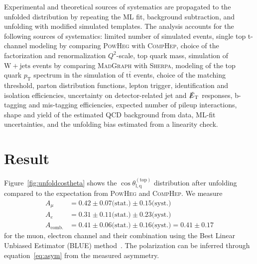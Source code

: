 \documentclass[a4paper]{jpconf}
\newcommand{\wjets}[0]{\mathrm{W+jets}}
\newcommand{\ttbar}[0]{\ensuremath{\mathrm{t\bar{t}}}}
\newcommand{\costheta}[0]{\cos\theta_{\mathrm{l,q}}^{\mathrm{(top)}}}
\newcommand{\pT}[0]{\ensuremath{p_\mathrm{T}}}
\newcommand{\met}[0]{\ensuremath{\slashed E_\mathrm{T}}}
\begin{document}
Experimental and theoretical sources of systematics are propagated to the unfolded distribution by repeating the ML fit, background subtraction, and unfolding with modified simulated templates. The analysis accounts for the following sources of systematics: limited number of simulated events, single top t-channel modeling by comparing \textsc{PowHeg} with \textsc{CompHep}, choice of the factorization and renormalization $Q^{2}$-scale, top quark mass, simulation of $\wjets$ events by comparing \textsc{MadGraph} with \textsc{Sherpa}, modeling of the  top quark $\pT$ spectrum in the simulation of $\ttbar$ events, choice of the matching threshold, parton distribution functions, lepton trigger, identification and isolation efficiencies, uncertainty on detector-related jet and $\met$ responses, b-tagging and mis-tagging efficiencies, expected number of pileup interactions, shape and yield of the estimated QCD background from data, ML-fit uncertainties, and the unfolding bias estimated from a linearity check.

\section{Result}

Figure~\ref{fig:unfoldcostheta} shows the $\costheta$ distribution after unfolding compared to the expectation from \textsc{PowHeg} and \textsc{CompHep}. We measure
\begin{align}
A_{\mu}&=0.42\pm 0.07 \textrm{(stat.)} \pm 0.15 \textrm{(syst.)} \\
A_{e}&=0.31\pm 0.11 \textrm{(stat.)} \pm 0.23 \textrm{(syst.)} \\
A_{\mathrm{comb.}}&=0.41\pm 0.06 \textrm{(stat.)} \pm 0.16 \textrm{(syst.)} = 0.41\pm 0.17
\end{align}
for the muon, electron channel and their combination using the Best Linear Unbiased Estimator (BLUE) method~\cite{blue}. The polarization can be inferred through equation~\ref{eq:asym} from the measured asymmetry.
\end{document}
